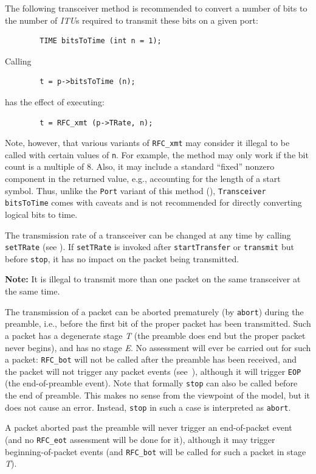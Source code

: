 The following transceiver method is recommended
to convert a number of bits to the number of {\em ITU\/}s
required to transmit these bits on a given port:
\begin{verbatim}
        TIME bitsToTime (int n = 1);
\end{verbatim}
Calling
\begin{verbatim}
        t = p->bitsToTime (n);
\end{verbatim}
has the effect of executing:
\begin{verbatim}
        t = RFC_xmt (p->TRate, n);
\end{verbatim}
\noindent
Note, however, that various variants of {\tt RFC\_xmt} may consider it illegal
to be called with certain values of {\tt n}.
For example, the method may only work if the bit count is a multiple of 8.
Also, it may include a standard ``fixed'' nonzero component in the returned
value, e.g., accounting for the length of a start symbol.
Thus, unlike the {\tt Port} variant of this method (),
{\tt Transceiver} {\tt bitsToTime} comes with caveats and is not recommended
for directly converting logical bits to time.

\medskip

The transmission rate of a transceiver can be changed at any time by calling
{\tt setTRate} (see ).
If {\tt setTRate} is invoked after {\tt startTransfer} or {\tt transmit} but
before {\tt stop}, it has no impact on the packet being transmitted.

\noindent
{\bf Note:}
It is illegal to transmit more than one packet on the same transceiver
at the same time.

The transmission of a packet can be aborted prematurely (by {\tt abort})
during the preamble, i.e., before the first bit of the proper packet has
been transmitted.
Such a packet has a degenerate stage {\em T\/} (the preamble does end but
the proper packet never begins),
and has no stage {\em E}.
No assessment will ever be carried out
for such a packet: {\tt RFC\_bot} will not
be called after the preamble has been received, and the packet will not trigger
any packet events (see~), although it will trigger 
{\tt EOP} (the end-of-preamble event).
Note that formally {\tt stop} can also be called before the end of preamble.
This makes no sense from the viewpoint of the model, but it does not cause
an error.
Instead, {\tt stop} in such a case is interpreted as {\tt abort}.

A packet aborted past the preamble will never trigger 
an end-of-packet event (and no {\tt RFC\_eot} assessment will be done for
it), although it may trigger beginning-of-packet events (and {\tt RFC\_bot}
will be called for such a packet in stage {\em T\/}).

